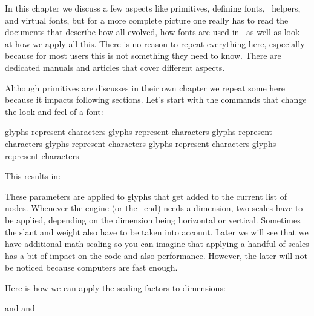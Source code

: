 In this chapter we discuss a few aspects like primitives, defining fonts, \LUA\
helpers, and virtual fonts, but for a more complete picture one really has to
read the documents that describe how all evolved, how fonts are used in \CONTEXT\
as well as look at how we apply all this. There is no reason to repeat everything
here, especially because for most users this is not something they need to know.
There are dedicated manuals and articles that cover different aspects.

\stopsection

\startsection[title={Primitives}]

\startsubsection[title=Basic properties]

Although primitives are discusses in their own chapter we repeat some here
because it impacts following sections. Let's start with the commands that change
the look and feel of a font:

\startbuffer
\begingroup                   glyphs represent characters \endgroup
\begingroup {} glyphs represent characters \endgroup
\begingroup \glyphxscale 1200 glyphs represent characters \endgroup
\begingroup \glyphyscale  800 glyphs represent characters \endgroup
\begingroup \glyphslant   200 glyphs represent characters \endgroup
\begingroup \glyphweight  200 glyphs represent characters \endgroup
\stopbuffer

\typebuffer[option=TEX]

This results in:

\startlines \getbuffer \stoplines

These parameters are applied to glyphs that get added to the current list of
nodes. Whenever the engine (or the \LUA\ end) needs a dimension, two scales have
to be applied, depending on the dimension being horizontal or vertical. Sometimes
the slant and weight also have to be taken into account. Later we will see that
we have additional math scaling so you can imagine that applying a handful of
scales has a bit of impact on the code and also performance. However, the later
will not be noticed because computers are fast enough.

Here is how we can apply the scaling factors to dimensions:

\startbuffer
{                  \the\glyphxscaled 100pt} and
{                  \the\glyphyscaled 100pt} and
{\glyphscale  1500 \glyphxscale 500 \the\glyphxscaled 100pt}
\stopbuffer

\typebuffer[option=TEX]


